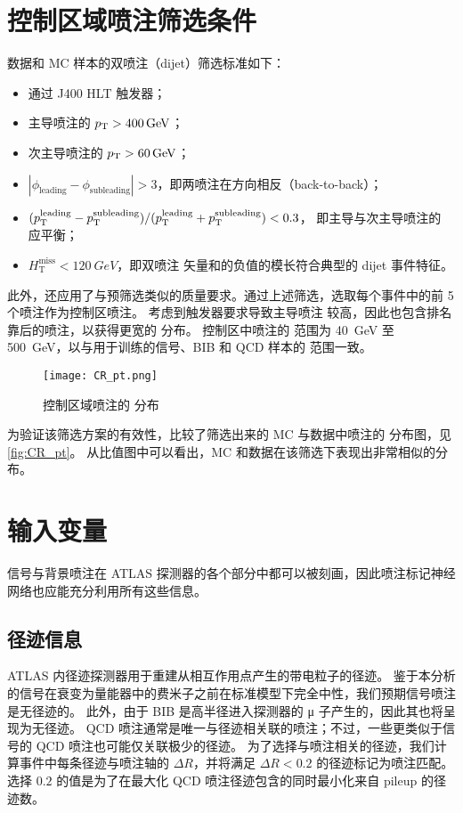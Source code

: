 \section{控制区域喷注筛选条件}
\label{cpm:CR_jet_selection}

数据和 MC 样本的双喷注（dijet）筛选标准如下：
\begin{itemize}
      \item 通过 J400 HLT 触发器；
      \item 主导喷注的 $p_{\text{T}} > \SI{400}{GeV}$；
      \item 次主导喷注的 $p_{\text{T}} > \SI{60}{GeV}$；
      \item $|\phi_{\text{leading}} - \phi_{\text{subleading}}| > 3$，即两喷注在方向相反（back-to-back）；
      \item $(p_{\text{T}}^{\text{leading}} - p_{\text{T}}^{\text{subleading}}) / (p_{\text{T}}^{\text{leading}} + p_{\text{T}}^{\text{subleading}}) < 0.3$，
            即主导与次主导喷注的 \pt 应平衡；
      \item $H_\text{T}^\text{miss} < \SI{120}{GeV}$，即双喷注 \pt 矢量和的负值的模长符合典型的 dijet 事件特征。
\end{itemize}

此外，还应用了与预筛选类似的质量要求。通过上述筛选，选取每个事件中的前 5 个喷注作为控制区喷注。
考虑到触发器要求导致主导喷注 \pt 较高，因此也包含排名靠后的喷注，以获得更宽的 \pt 分布。
控制区中喷注的 \pt 范围为 \SI{40}{GeV} 至 \SI{500}{GeV}，以与用于训练的信号、BIB 和 QCD 样本的 \pt 范围一致。

\begin{figure}[ht]
      \centering
      \texttt{[image: CR\_pt.png]}
      \caption{控制区域喷注的 \pt 分布}
      \label{fig:CR_pt}
\end{figure}

为验证该筛选方案的有效性，比较了筛选出来的 MC 与数据中喷注的 \pt 分布图，见\autoref{fig:CR_pt}。
从比值图中可以看出，MC 和数据在该筛选下表现出非常相似的分布。


\section{输入变量}
\label{cpm:NN_variables}

信号与背景喷注在 ATLAS 探测器的各个部分中都可以被刻画，因此喷注标记神经网络也应能充分利用所有这些信息。

\subsection{径迹信息}
ATLAS 内径迹探测器用于重建从相互作用点产生的带电粒子的径迹。
鉴于本分析的信号在衰变为量能器中的费米子之前在标准模型下完全中性，我们预期信号喷注是无径迹的。
此外，由于 BIB 是高半径进入探测器的 μ 子产生的，因此其也将呈现为无径迹。
QCD 喷注通常是唯一与径迹相关联的喷注；不过，一些更类似于信号的 QCD 喷注也可能仅关联极少的径迹。
为了选择与喷注相关的径迹，我们计算事件中每条径迹与喷注轴的 $\Delta R$，并将满足 $\Delta R < 0.2$ 的径迹标记为喷注匹配。
选择 $0.2$ 的值是为了在最大化 QCD 喷注径迹包含的同时最小化来自 pileup 的径迹数。

